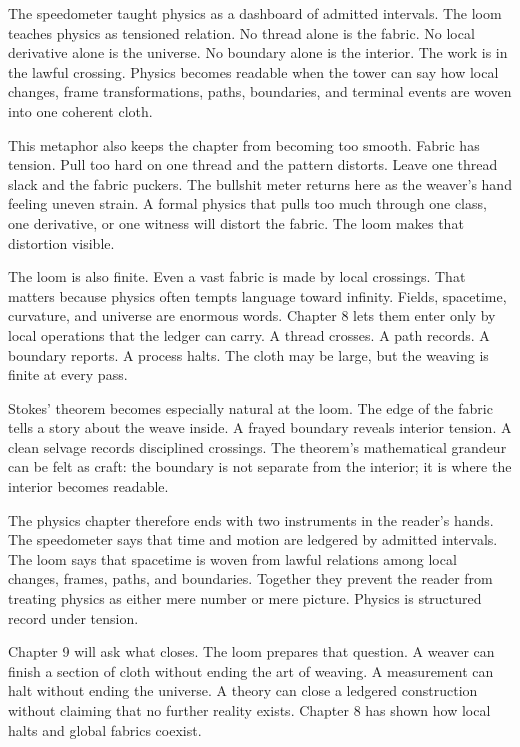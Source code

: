 The speedometer taught physics as a dashboard of admitted intervals. The loom
teaches physics as tensioned relation. No thread alone is the fabric. No local
derivative alone is the universe. No boundary alone is the interior. The work
is in the lawful crossing. Physics becomes readable when the tower can say how
local changes, frame transformations, paths, boundaries, and terminal events
are woven into one coherent cloth.

This metaphor also keeps the chapter from becoming too smooth. Fabric has
tension. Pull too hard on one thread and the pattern distorts. Leave one thread
slack and the fabric puckers. The bullshit meter returns here as the weaver's
hand feeling uneven strain. A formal physics that pulls too much through one
class, one derivative, or one witness will distort the fabric. The loom makes
that distortion visible.

The loom is also finite. Even a vast fabric is made by local crossings. That
matters because physics often tempts language toward infinity. Fields,
spacetime, curvature, and universe are enormous words. Chapter 8 lets them
enter only by local operations that the ledger can carry. A thread crosses. A
path records. A boundary reports. A process halts. The cloth may be large, but
the weaving is finite at every pass.

Stokes' theorem becomes especially natural at the loom. The edge of the fabric
tells a story about the weave inside. A frayed boundary reveals interior
tension. A clean selvage records disciplined crossings. The theorem's
mathematical grandeur can be felt as craft: the boundary is not separate from
the interior; it is where the interior becomes readable.

The physics chapter therefore ends with two instruments in the reader's hands.
The speedometer says that time and motion are ledgered by admitted intervals.
The loom says that spacetime is woven from lawful relations among local
changes, frames, paths, and boundaries. Together they prevent the reader from
treating physics as either mere number or mere picture. Physics is structured
record under tension.

Chapter 9 will ask what closes. The loom prepares that question. A weaver can
finish a section of cloth without ending the art of weaving. A measurement can
halt without ending the universe. A theory can close a ledgered construction
without claiming that no further reality exists. Chapter 8 has shown how local
halts and global fabrics coexist.

